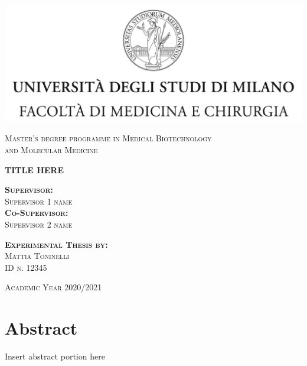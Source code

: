 \documentclass[a4paper, 12pt, oneside]{report}
\begin{document}
\begin{titlepage} %

\begin{center}
	\includegraphics{logo/tesiMEDICINA_CHIRURGIA.jpg}\par
	\vspace{1cm}
	{\scshape\large Master's degree programme in Medical Biotechnology \\ and Molecular Medicine\par}
	\vspace{4cm}
	{\scshape\large\bfseries TITLE HERE\par}
	\vspace{4cm}
	\end{center}
	
	\begin{multicols}{2}
	\begin{center}
	 	{
                  \scshape\normalsize\textbf{Supervisor:}\\ Supervisor 1 name\\
                 \scshape\normalsize\textbf{Co-Supervisor:}\\Supervisor 2 name\par}
	\vfill
	\scshape\normalsize\textbf{Experimental Thesis by:}\\Mattia Toninelli\\ID n. 12345 \par 
	\end{center}
	\end{multicols}
	
	\vfill

	{\begin{center}
	     \scshape\large Academic Year 2020/2021
	\end{center}}

\end{titlepage}

\section{Abstract}
Insert abstract portion here    

\tableofcontents

%
%

\printbibliography

\medskip

\
\end{document}
